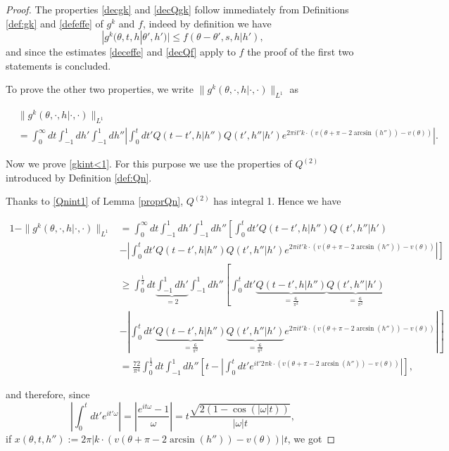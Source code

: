 \documentclass[a4paper,10pt,reqno]{amsart}
\numberwithin{equation}{subsection}
\numberwithin{figure}{subsection}
\begin{document}
\begin{proof} The properties \eqref{decgk} and \eqref{decQgk} follow immediately from Definitions \ref{def:gk} and \ref{defeffe} of $g^k$ and $f$, indeed by definition we have
\[
|g^k(\theta,t,h|\theta',h')|\leq f(\theta-\theta',s,h|h'),
\]
and since the estimates \eqref{deceffe} and \eqref{decQf} apply to $f$ the proof of the first two statements is concluded.

To prove the other two properties, we write $\|g^k(\theta,\cdot,h|\cdot,\cdot)\|_{L^1}$ as

{\footnotesize\begin{align*}
&\|g^k(\theta,\cdot,h|\cdot,\cdot)\|_{L^1}
\\
&=\int_0^{\infty}dt\int_{-1}^1dh'\int_{-1}^1dh''\left|\int_0^tdt' Q(t-t',h|h'')Q(t',h''|h')e^{2\pi it' k\cdot(v(\theta+\pi-2\arcsin(h''))-v(\theta))}\right|.
\end{align*}}

Now we prove \eqref{gkint<1}. For this purpose we use the properties of $Q^{(2)}$ introduced by Definition \ref{def:Qn}.

Thanks to \eqref{Qnint1} of Lemma \ref{proprQn}, $Q^{(2)}$ has integral 1. Hence we have

{\footnotesize\begin{align*}
1-\|g^k(\theta,\cdot,h|\cdot,\cdot)\|_{L^1}&=\int_0^{\infty}dt\int_{-1}^1dh'\int_{-1}^1dh''\left[\int_0^tdt' Q(t-t',h|h'')Q(t',h''|h')\right.
\\
&-\left.\left|\int_0^tdt' Q(t-t',h|h'')Q(t',h''|h')e^{2\pi it' k\cdot(v(\theta+\pi-2\arcsin(h''))-v(\theta))}\right|\right]
\\
&\geq\int_0^{\frac{1}{2}}dt\underbrace{\int_{-1}^1dh'}_{=2}\int_{-1}^1dh''\left[\int_0^tdt' \underbrace{Q(t-t',h|h'')}_{=\frac{6}{\pi^2}}\underbrace{Q(t',h''|h')}_{=\frac{6}{\pi^2}}\right.
\\
&-\left.\left|\int_0^tdt' \underbrace{Q(t-t',h|h'')}_{=\frac{6}{\pi^2}}\underbrace{Q(t',h''|h')}_{=\frac{6}{\pi^2}}e^{2\pi it' k\cdot(v(\theta+\pi-2\arcsin(h''))-v(\theta))}\right|\right]
\\
&=\frac{72}{\pi^4}\int_0^{\frac{1}{2}}dt\int_{-1}^1dh''\left[t-\left|\int_0^tdt'e^{it'2\pi k\cdot(v(\theta+\pi-2\arcsin(h''))-v(\theta))}\right|\right],
\end{align*}}

and therefore, since
\[
\left|\int_0^tdt'e^{it'\omega}\right|=\left|\frac{e^{it\omega}-1}{\omega}\right|=t\frac{\sqrt{2(1-\cos(|\omega|t))}}{|\omega|t},
\]
if $x(\theta,t,h''):=2\pi|k\cdot(v(\theta+\pi-2\arcsin(h''))-v(\theta))|t$, we got


\end{proof}
\end{document}
